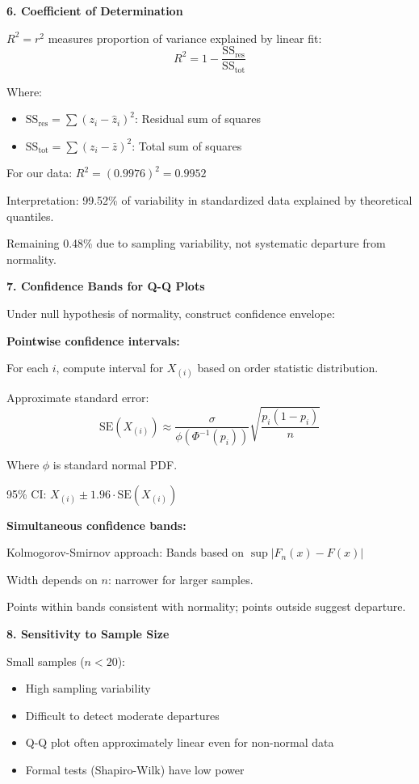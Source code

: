 \documentclass[12pt]{article}
\begin{document}
\begin{explanation}
\textbf{6. Coefficient of Determination}

$R^2 = r^2$ measures proportion of variance explained by linear fit:
\[R^2 = 1 - \frac{\text{SS}_{\text{res}}}{\text{SS}_{\text{tot}}}\]

Where:
\begin{itemize}
\item $\text{SS}_{\text{res}} = \sum (z_i - \hat{z}_i)^2$: Residual sum of squares
\item $\text{SS}_{\text{tot}} = \sum (z_i - \bar{z})^2$: Total sum of squares
\end{itemize}

For our data: $R^2 = (0.9976)^2 = 0.9952$

Interpretation: 99.52\% of variability in standardized data explained by theoretical quantiles.

Remaining 0.48\% due to sampling variability, not systematic departure from normality.

\textbf{7. Confidence Bands for Q-Q Plots}

Under null hypothesis of normality, construct confidence envelope:

\textbf{Pointwise confidence intervals:}

For each $i$, compute interval for $X_{(i)}$ based on order statistic distribution.

Approximate standard error:
\[\text{SE}(X_{(i)}) \approx \frac{\sigma}{\phi(\Phi^{-1}(p_i))} \sqrt{\frac{p_i(1-p_i)}{n}}\]

Where $\phi$ is standard normal PDF.

95\% CI: $X_{(i)} \pm 1.96 \cdot \text{SE}(X_{(i)})$

\textbf{Simultaneous confidence bands:}

Kolmogorov-Smirnov approach: Bands based on $\sup |F_n(x) - F(x)|$

Width depends on $n$: narrower for larger samples.

Points within bands consistent with normality; points outside suggest departure.

\textbf{8. Sensitivity to Sample Size}

Small samples ($n < 20$):
\begin{itemize}
\item High sampling variability
\item Difficult to detect moderate departures
\item Q-Q plot often approximately linear even for non-normal data
\item Formal tests (Shapiro-Wilk) have low power
\end{itemize}


\end{explanation}
\end{document}
